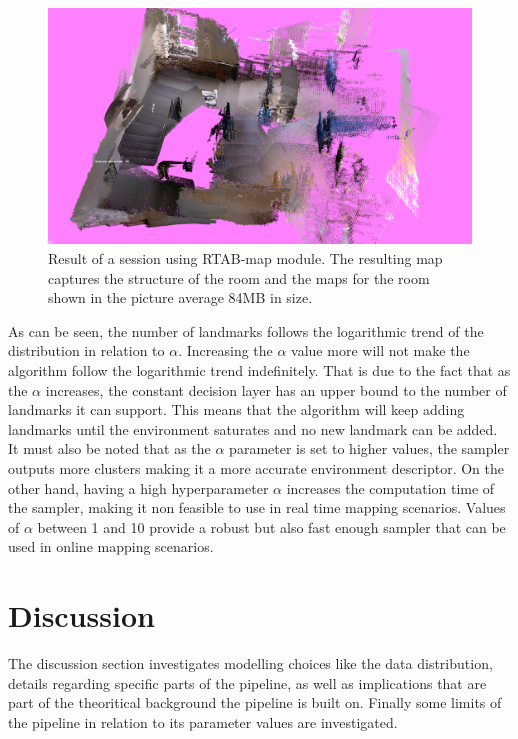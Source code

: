 \documentclass[twoside,hidelinks]{article}
\begin{document}
\begin{figure}[ht!]
  \centering
    \includegraphics[width=.8\textwidth]{rtabmap}
    \caption{Result of a session using RTAB-map module. The resulting map captures the structure of the room and the maps for the room shown in the picture average 84MB in size.}
  \label{rtabmap}
\end{figure}

As can be seen, the number of landmarks follows the logarithmic trend of the distribution in relation to $\alpha$.
Increasing the $\alpha$ value more will not make the algorithm follow the logarithmic trend indefinitely. 
That is due to the fact that as the $\alpha$ increases, the constant decision layer has an upper bound to the number of landmarks it can support. 
This means that the algorithm will keep adding landmarks until the environment saturates and no new landmark can be added.
It must also be noted that as the $\alpha$ parameter is set to higher values, the sampler outputs more clusters making it a more accurate environment descriptor.
On the other hand, having a high hyperparameter $\alpha$ increases the computation time of the sampler, making it non feasible to use in real time mapping scenarios.
Values of $\alpha$ between 1 and 10 provide a robust but also fast enough sampler that can be used in online mapping scenarios.


\newpage
\section{Discussion}
\label{sec:discussion}

The discussion section investigates modelling choices like the data distribution, details regarding specific parts of the pipeline, as well as implications that are part of the theoritical background the pipeline is built on. Finally some limits of the pipeline in relation to its parameter values are investigated.
\end{document}
